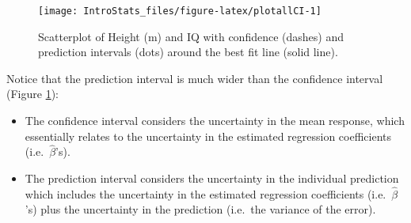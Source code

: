 \documentclass[
  oneside]{krantz}
\newenvironment{Shaded}{\begin{snugshade}}{\end{snugshade}}
\newcommand{\AttributeTok}[1]{\textcolor[rgb]{0.77,0.63,0.00}{#1}}
\newcommand{\CommentTok}[1]{\textcolor[rgb]{0.56,0.35,0.01}{\textit{#1}}}
\newcommand{\ConstantTok}[1]{\textcolor[rgb]{0.00,0.00,0.00}{#1}}
\newcommand{\DecValTok}[1]{\textcolor[rgb]{0.00,0.00,0.81}{#1}}
\newcommand{\FloatTok}[1]{\textcolor[rgb]{0.00,0.00,0.81}{#1}}
\newcommand{\FunctionTok}[1]{\textcolor[rgb]{0.00,0.00,0.00}{#1}}
\newcommand{\NormalTok}[1]{#1}
\newcommand{\OtherTok}[1]{\textcolor[rgb]{0.56,0.35,0.01}{#1}}
\newcommand{\SpecialCharTok}[1]{\textcolor[rgb]{0.00,0.00,0.00}{#1}}
\newcommand{\StringTok}[1]{\textcolor[rgb]{0.31,0.60,0.02}{#1}}
\providecommand{\tightlist}{%
  \setlength{\itemsep}{0pt}\setlength{\parskip}{0pt}}
\begin{document}
\begin{Shaded}
\end{Shaded}

\begin{figure}

{\centering \texttt{[image: IntroStats\_files/figure-latex/plotallCI-1]} 

}

\caption{Scatterplot of Height (m) and IQ with confidence (dashes) and prediction intervals (dots) around the best fit line (solid line).}\label{fig:plotallCI}
\end{figure}

Notice that the prediction interval is much wider than the confidence interval (Figure \ref{fig:plotallCI}):

\begin{itemize}
\tightlist
\item
  The confidence interval considers the uncertainty in the mean response, which essentially relates to the uncertainty in the estimated regression coefficients (i.e.~\(\hat \beta\)'s).
\item
  The prediction interval considers the uncertainty in the individual prediction which includes the uncertainty in the estimated regression coefficients (i.e.~\(\hat \beta\)'s) plus the uncertainty in the prediction (i.e.~the variance of the error).
\end{itemize}
\end{document}
